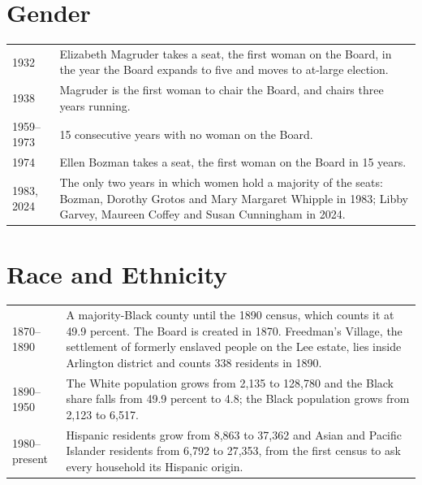 \documentclass[11pt]{article}
\makeatletter
\newcommand{\timeline}[1]{%
  \begin{center}
  \begin{tabular}{@{}p{0.17\textwidth}p{0.77\textwidth}@{}}
    \toprule
    #1
    \bottomrule
  \end{tabular}
  \end{center}}
\let\oldsection\section
\renewcommand{\section}{\clearpage\oldsection}
\makeatother
\begin{document}

\section{Gender}

\timeline{
  1932 & Elizabeth Magruder takes a seat, the first woman on the Board, in the
  year the Board expands to five and moves to at-large election. \\[2pt]
  1938 & Magruder is the first woman to chair the Board, and chairs three years
  running.\autocite{arlingtonva2026members} \\[2pt]
  1959--1973 & 15 consecutive years with no woman on the Board. \\[2pt]
  1974 & Ellen Bozman takes a seat, the first woman on the Board in 15
  years. \\[2pt]
  1983, 2024 & The only two years in which women hold a majority of the seats:
  Bozman, Dorothy Grotos and Mary Margaret Whipple in 1983; Libby Garvey, Maureen
  Coffey and Susan Cunningham in 2024. \\
}

\section{Race and Ethnicity}

\timeline{
  1870--1890 & A majority-Black county until the 1890 census, which counts it
  at 49.9 percent. The Board is created in 1870. Freedman's Village, the
  settlement of formerly enslaved people on the Lee estate, lies inside
  Arlington district and counts 338 residents in
  1890.\autocite{census1890} \\[2pt]
  1890--1950 & The White population grows from 2,135 to 128,780 and the Black
  share falls from 49.9 percent to 4.8; the Black population grows from 2,123 to
  6,517. %
  \\[2pt]
  1980--present & Hispanic residents grow from 8,863 to 37,362 and Asian and
  Pacific Islander residents from 6,792 to 27,353, from the first census to ask
  every household its Hispanic origin. \\
}
\end{document}
